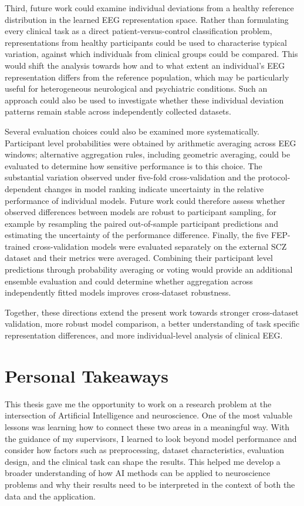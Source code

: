 Third, future work could examine individual deviations from a healthy reference distribution in the learned EEG representation space. Rather than formulating every clinical task as a direct patient-versus-control classification problem, representations from healthy participants could be used to characterise typical variation, against which individuals from clinical groups could be compared. This would shift the analysis towards how and to what extent an individual's EEG representation differs from the reference population, which may be particularly useful for heterogeneous neurological and psychiatric conditions. Such an approach could also be used to investigate whether these individual deviation patterns remain stable across independently collected datasets.

Several evaluation choices could also be examined more systematically. Participant level probabilities were obtained by arithmetic averaging across EEG windows; alternative aggregation rules, including geometric averaging, could be evaluated to determine how sensitive performance is to this choice. The substantial variation observed under five-fold cross-validation and the protocol-dependent changes in model ranking indicate uncertainty in the relative performance of individual models. Future work could therefore assess whether observed differences between models are robust to participant sampling, for example by resampling the paired out-of-sample participant predictions and estimating the uncertainty of the performance difference. Finally, the five FEP-trained cross-validation models were evaluated separately on the external SCZ dataset and their metrics were averaged. Combining their participant level predictions through probability averaging or voting would provide an additional ensemble evaluation and could determine whether aggregation across independently fitted models improves cross-dataset robustness.


Together, these directions extend the present work towards stronger cross-dataset validation, more robust model comparison, a better understanding of task specific representation differences, and more individual-level analysis of clinical EEG.


\section{Personal Takeaways}

This thesis gave me the opportunity to work on a research problem at the intersection of Artificial Intelligence and neuroscience. One of the most valuable lessons was learning how to connect these two areas in a meaningful way. With the guidance of my supervisors, I learned to look beyond model performance and consider how factors such as preprocessing, dataset characteristics, evaluation design, and the clinical task can shape the results. This helped me develop a broader understanding of how AI methods can be applied to neuroscience problems and why their results need to be interpreted in the context of both the data and the application.

